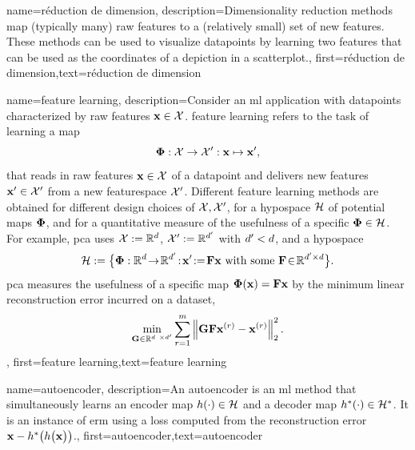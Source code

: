 {name={réduction de dimension},
	description={Dimensionality reduction methods 
		map (typically many) raw \gls{feature}s to a (relatively small) set of 
		new \gls{feature}s. These methods can be used to visualize \gls{datapoint}s 
		by learning two \gls{feature}s that can be used as the coordinates of a 
		depiction in a \gls{scatterplot}.}, first={réduction de dimension},text={réduction de dimension}
} 


{name={feature learning},
	description={Consider an \gls{ml} application with \gls{datapoint}s characterized by 
		raw \gls{feature}s ${\bf x} \in \mathcal{X}$. \Gls{feature} learning 
		refers to the task of learning a map 
		$${\bf \Phi}: \mathcal{X} \rightarrow \mathcal{X}': {\bf x} \mapsto {\bf x}',$$ 
		that reads in raw \gls{feature}s ${\bf x} \in \mathcal{X}$ of a \gls{datapoint} and delivers new 
		\gls{feature}s ${\bf x}' \in \mathcal{X}'$ from a new \gls{featurespace} $\mathcal{X}'$. 
		Different \gls{feature} learning methods are obtained for different design 
		choices of $\mathcal{X},\mathcal{X}'$, for a \gls{hypospace} $\mathcal{H}$ 
		of potential maps ${\bf \Phi}$, and for a quantitative measure of the usefulness of 
		a specific ${\bf \Phi} \in \mathcal{H}$. For example, \gls{pca} 
		uses $\mathcal{X} := \mathbb{R}^{d}$, $\mathcal{X}' := \mathbb{R}^{d'}$ 
		with $d' < d$, and a \gls{hypospace} 
		$$\hypospace\defeq \big\{ \featuremapvec: \mathbb{R}^{\dimlocalmodel}
		\!\rightarrow\! \mathbb{R}^{\dimlocalmodel'}\!:\!\featurevec'\!\defeq\!\mF \featurevec \mbox{ with some } \mF \!\in\! \mathbb{R}^{\dimlocalmodel' \times \dimlocalmodel} \big\}.$$ \Gls{pca} measures the usefulness of a specific map ${\bf \Phi}({\bf x})= \mathbf{F} {\bf x}$ 
	by the \gls{minimum} linear reconstruction error incurred on a \gls{dataset}, 
$$ \min_{\mG \in \mathbb{R}^{\dimlocalmodel \times \dimlocalmodel'}} \sum_{\sampleidx=1}^{\samplesize} \normgeneric{\mG \mF \featurevec^{(\sampleidx)} - \featurevec^{(\sampleidx)}}{2}^{2}.$$ }, 
	first={feature learning},text={feature learning}
} 

{name={autoencoder},
	description={An autoencoder is an \gls{ml} method that simultaneously learns an encoder map 
		$h(\cdot) \in \mathcal{H}$ and a decoder map $h^{*}(\cdot) \in \mathcal{H}^{*}$. 
		It is an instance of \gls{erm} using a \gls{loss} computed from the reconstruction error 
		${\bf x} - h^{*}\big(  h \big( {\bf x} \big) \big)$.},
	first={autoencoder},text={autoencoder}
} 

